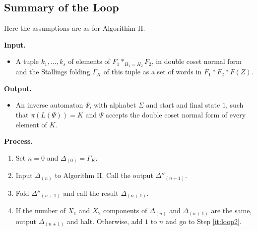 \documentclass[a4paper,12pt]{article}
\newcommand{\G}{\Gamma }
\newcommand{\D}{\Delta }
\numberwithin{equation}{section}
\numberwithin{figure}{section}
\newcommand{\be}{\begin{enumerate}}
\newcommand{\ee}{\end{enumerate}}
\newcommand{\biz}{\begin{itemize}}
\newcommand{\eiz}{\end{itemize}}
\begin{document}
\subsection{Summary of the Loop}
Here the assumptions are as for Algorithim II.

\noindent\textbf{Input.}
\biz
\item A tuple $k_1, \ldots ,k_s$ of elements of $F_1*_{H_1=H_2}F_2$,
in double coset normal form and the Stallings folding $\G_K$ of this
tuple as a set of words in $F_1*F_2*F(Z)$.
\eiz
\noindent\textbf{Output.}
\biz
\item An inverse automaton $\Psi$, with alphabet $\Sigma$ and start
and final state $1$, such that $\pi(L(\Psi))=K$ and $\Psi$ accepts the
double coset normal form of every element of $K$.
\eiz
\noindent\textbf{Process.}\\
\be
\item Set $n=0$ and $\D_{(0)}=\G_K$.
\item\label{it:loop2} Input $\D_{(n)}$ to Algorithm II.
Call the output $\D''_{(n+1)}$.
\item\label{it:loop3} Fold  $\D''_{(n+1)}$ and call the result   $\D_{(n+1)}$.
\item If the number of $X_1$ and $X_2$ components of $\D_{(n)}$ and
$\D_{(n+1)}$ are the same, output $\D_{(n+1)}$ and halt. Otherwise,
 add $1$ to $n$ and go to Step \ref{it:loop2}.
\ee
\end{document}
